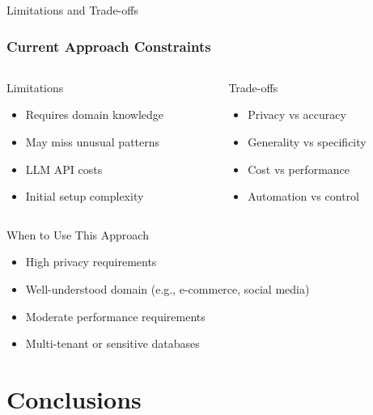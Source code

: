 \documentclass[smaller]{beamer}
\begin{document}
\begin{frame}{Limitations and Trade-offs}
\frametitle{Current Approach Constraints}

\begin{columns}[T]
\begin{column}{0.5\textwidth}
\begin{block}{Limitations}
\begin{itemize}
    \item Requires domain knowledge
    \item May miss unusual patterns
    \item LLM API costs
    \item Initial setup complexity
\end{itemize}
\end{block}
\end{column}

\begin{column}{0.5\textwidth}
\begin{block}{Trade-offs}
\begin{itemize}
    \item Privacy vs accuracy
    \item Generality vs specificity
    \item Cost vs performance
    \item Automation vs control
\end{itemize}
\end{block}
\end{column}
\end{columns}

\vspace{0.5cm}

\begin{exampleblock}{When to Use This Approach}
\begin{itemize}
    \item High privacy requirements
    \item Well-understood domain (e.g., e-commerce, social media)
    \item Moderate performance requirements
    \item Multi-tenant or sensitive databases
\end{itemize}
\end{exampleblock}

\end{frame}

\section{Conclusions}
\end{document}
